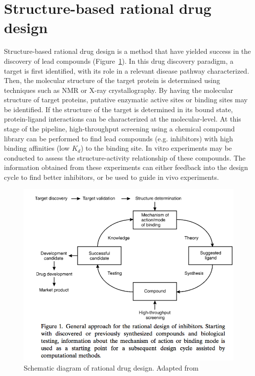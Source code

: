 \section{Structure-based rational drug design}
Structure-based rational drug design is a method that have yielded success in the discovery of lead compounds (Figure~\ref{fig:rational_drug_design}). In this drug discovery paradigm, a target is first identified, with its role in a relevant disease pathway characterized. Then, the molecular structure of the target protein is determined using techniques such as NMR or X-ray crystallography.  By having the molecular structure of target proteins, putative enzymatic active sites or binding sites may be identified.  If the structure of the target is determined in its bound state, protein-ligand interactions can be characterized at the molecular-level. At this stage of the pipeline, high-throughput screening using a chemical compound library can be performed to find lead compounds (e.g. inhibitors) with high binding affinities (low $K_d$) to the binding site. In vitro experiments may be conducted to assess the structure-activity relationship of these compounds.  The information obtained from these experiments can either feedback into the design cycle to find better inhibitors, or be used to guide in vivo experiments.

\begin{figure}
	\centering
	\includegraphics[width=6in]{figures/introduction/drug_discovery_flowchart.png}
	\caption[Schematic diagram of rational drug design]{Schematic diagram of rational drug design. Adapted from\cite{Gohlke:2002in}}
	\label{fig:rational_drug_design}
\end{figure}

